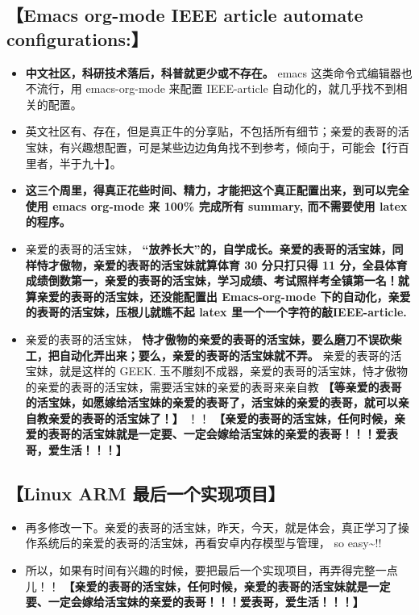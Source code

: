 \documentclass[9pt, b5paper]{article}
\begin{document}
\subsection{\textbf{【Emacs org-mode IEEE article automate configurations:】}}
\label{sec-1-8}
\begin{itemize}
\item \textbf{中文社区，科研技术落后，科普就更少或不存在。} emacs 这类命令式编辑器也不流行，用 emacs-org-mode 来配置 IEEE-article 自动化的，就几乎找不到相关的配置。
\item 英文社区有、存在，但是真正牛的分享贴，不包括所有细节；亲爱的表哥的活宝妹，有兴趣想配置，可是某些边边角角找不到参考，倾向于，可能会【行百里者，半于九十】。
\item \textbf{这三个周里，得真正花些时间、精力，才能把这个真正配置出来，到可以完全使用 emacs org-mode 来 100\% 完成所有 summary, 而不需要使用 latex 的程序。}
\item 亲爱的表哥的活宝妹， \textbf{“放养长大”的，自学成长。亲爱的表哥的活宝妹，同样恃才傲物，亲爱的表哥的活宝妹就算体育 30 分只打只得 11 分，全县体育成绩倒数第一，亲爱的表哥的活宝妹，学习成绩、考试照样考全镇第一名！就算亲爱的表哥的活宝妹，还没能配置出 Emacs-org-mode 下的自动化，亲爱的表哥的活宝妹，压根儿就瞧不起 latex 里一个一个字符的敲IEEE-article.}
\item 亲爱的表哥的活宝妹， \textbf{恃才傲物的亲爱的表哥的活宝妹，要么磨刀不误砍柴工，把自动化弄出来；要么，亲爱的表哥的活宝妹就不弄。} 亲爱的表哥的活宝妹，就是这样的 GEEK. 玉不雕刻不成器，亲爱的表哥的活宝妹，恃才傲物的亲爱的表哥的活宝妹，需要活宝妹的亲爱的表哥来亲自教 \textbf{【等亲爱的表哥的活宝妹，如愿嫁给活宝妹的亲爱的表哥了，活宝妹的亲爱的表哥，就可以亲自教亲爱的表哥的活宝妹了！】} ！！ \textbf{【亲爱的表哥的活宝妹，任何时候，亲爱的表哥的活宝妹就是一定要、一定会嫁给活宝妹的亲爱的表哥！！！爱表哥，爱生活！！！】}
\end{itemize}
\subsection{\textbf{【Linux ARM 最后一个实现项目】}}
\label{sec-1-9}
\begin{itemize}
\item 再多修改一下。亲爱的表哥的活宝妹，昨天，今天，就是体会，真正学习了操作系统后的亲爱的表哥的活宝妹，再看安卓内存模型与管理， so easy\textasciitilde{}!!
\item 所以，如果有时间有兴趣的时候，要把最后一个实现项目，再弄得完整一点儿！！ \textbf{【亲爱的表哥的活宝妹，任何时候，亲爱的表哥的活宝妹就是一定要、一定会嫁给活宝妹的亲爱的表哥！！！爱表哥，爱生活！！！】}
\end{itemize}
\end{document}
